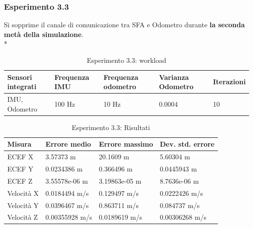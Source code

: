 \subsubsection{Esperimento 3.3}
Si sopprime il canale di comunicazione tra SFA e Odometro durante \textbf{la seconda met\`a della simulazione}.\\* 
\begin{table}[h]
	\centering
\begin{tabular}{|p{3.25cm}|p{2cm}|p{2cm}|p{2cm}|p{2cm}|}
	\hline 
	\textbf{Sensori integrati} & \textbf{Frequenza IMU}  & \textbf{Frequenza odometro} & \textbf{Varianza Odometro} & \textbf{Iterazioni} \\ 
	\hline 
	IMU, Odometro & 100 Hz & 10 Hz & 0.0004 & 10 \\
	\hline 
\end{tabular}
	\caption{Esperimento 3.3: workload}
\end{table}
\begin{table}[h]
	\centering
	\begin{tabular}{|p{2cm}|p{3.2cm}|p{3cm}|p{3cm}|}
	\hline 
	\textbf{Misura} 
	& \textbf{Errore medio} 
	& \textbf{Errore massimo}
	& \textbf{Dev. std. errore}\\ 
	\hline 
	ECEF X & 3.57373 m & 20.1609 m & 5.60304 m \\ 
	\hline 
	ECEF Y & 0.0234386 m & 0.366496 m & 0.0445943 m \\ 
	\hline 
	ECEF Z & 3.55578e-06 m & 3.19863e-05 m & 8.7636e-06 m \\ 
	\hline 
	Velocit\`a X & 0.0184494 m/s & 0.129497 m/s & 0.0222426 m/s \\ 
	\hline 
	Velocit\`a Y & 0.0396467 m/s & 0.863711 m/s & 0.084737 m/s \\ 
	\hline 
	Velocit\`a Z & 0.00355928 m/s & 0.0189619 m/s & 0.00306268 m/s \\ 
	\hline 
\end{tabular} 
	\caption{Esperimento 3.3: Risultati}
\end{table}
